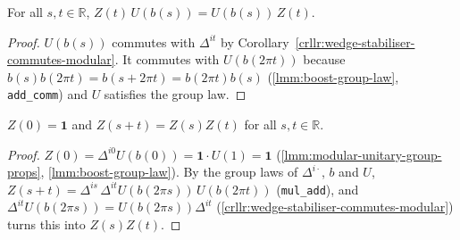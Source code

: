 \begin{lemma}
    \label{lmm:wedge-modular-defect-boosts}
    \leanok
    For all $s, t \in \mathbb{R}$, $Z(t)\,U(b(s)) = U(b(s))\,Z(t)$.
\end{lemma}
\begin{proof}
    \leanok
    $U(b(s))$ commutes with $\Delta^{it}$ by Corollary~\ref{crllr:wedge-stabiliser-commutes-modular}. It commutes with $U(b(2\pi t))$ because $b(s)b(2\pi t) = b(s + 2\pi t) = b(2\pi t)b(s)$ (\ref{lmm:boost-group-law}, \texttt{add\_comm}) and $U$ satisfies the group law.
\end{proof}

\begin{lemma}
    \label{lmm:wedge-modular-defect-group}
    \leanok
    $Z(0) = \mathbf{1}$ and $Z(s + t) = Z(s)Z(t)$ for all $s, t \in \mathbb{R}$.
\end{lemma}
\begin{proof}
    \leanok
    $Z(0) = \Delta^{i0}U(b(0)) = \mathbf{1}\cdot U(1) = \mathbf{1}$ (\ref{lmm:modular-unitary-group-props}, \ref{lmm:boost-group-law}). By the group laws of $\Delta^{i\cdot}$, $b$ and $U$, $Z(s+t) = \Delta^{is}\,\Delta^{it}U(b(2\pi s))\,U(b(2\pi t))$ (\texttt{mul\_add}), and $\Delta^{it}U(b(2\pi s)) = U(b(2\pi s))\Delta^{it}$ (\ref{crllr:wedge-stabiliser-commutes-modular}) turns this into $Z(s)Z(t)$.
\end{proof}

